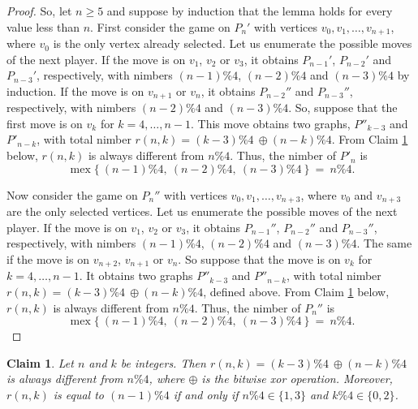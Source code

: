 \documentclass[12pt]{article}
\newtheorem{claim}[theorem]{Claim}
\DeclareMathOperator{\mex}{mex}
\newcommand{\xor}{\oplus}
\begin{document}
\begin{proof}
So, let $n\geq 5$ and suppose by induction that the lemma holds for every value less than $n$.
First consider the game on $P_n'$ with vertices $v_0,v_1,\ldots,v_{n+1}$, where $v_0$ is the only vertex already selected. Let us enumerate the possible moves of the next player.
If the move is on $v_1$, $v_2$ or $v_3$, it obtains $P_{n-1}'$, $P_{n-2}'$ and $P_{n-3}'$, respectively, with nimbers $(n-1)\% 4$,  $(n-2)\% 4$ and $(n-3)\% 4$ by induction.
If the move is on $v_{n+1}$ or $v_n$, it obtains $P_{n-2}''$ and $P_{n-3}''$, respectively, with nimbers $(n-2)\% 4$ and $(n-3)\% 4$.
So, suppose that the first move is on $v_k$ for $k=4,\ldots,n-1$.
This move obtains two graphs, $P''_{k-3}$ and $P'_{n-k}$, with total nimber $r(n,k)=(k-3)\% 4\ \xor (n-k)\% 4$.
From Claim \ref{claim1} below, $r(n,k)$ is always different from $n\% 4$. Thus, the nimber of $P'_n$ is
\[
\mex\Big\{\ (n-1)\% 4,\ (n-2)\% 4,\ (n-3)\% 4\ \Big\}\ =\ n\% 4.
\]

Now consider the game on $P_n''$ with vertices $v_0,v_1,\ldots,v_{n+3}$, where $v_0$ and $v_{n+3}$ are the only selected vertices. Let us enumerate the possible moves of the next player.
If the move is on $v_1$, $v_2$ or $v_3$, it obtains $P_{n-1}''$, $P_{n-2}''$ and $P_{n-3}''$, respectively, with nimbers $(n-1)\% 4$,  $(n-2)\% 4$ and  $(n-3)\% 4$.
The same if the move is on $v_{n+2}$, $v_{n+1}$ or $v_n$.
So suppose that the move is on $v_k$ for $k=4,\ldots,n-1$.
It obtains two graphs $P''_{k-3}$ and $P''_{n-k}$, with total nimber $r(n,k)=(k-3)\% 4\ \xor (n-k)\% 4$, defined above. From Claim \ref{claim1} below, $r(n,k)$ is always different from $n\% 4$. Thus, the nimber of $P_n''$ is
\[
\mex\Big\{\ (n-1)\% 4,\ (n-2)\% 4,\ (n-3)\% 4\ \Big\}\ =\ n\% 4.
\]
\end{proof}

\begin{claim}\label{claim1}
Let $n$ and $k$ be integers. Then $r(n,k)=(k-3)\% 4\ \xor (n-k)\% 4$ is always different from $n\% 4$, where $\xor$ is the bitwise xor operation. Moreover, $r(n,k)$ is equal to $(n-1)\% 4$ if and only if $n\% 4\in\{1,3\}$ and $k\% 4\in\{0,2\}$.
\end{claim}
\end{document}
